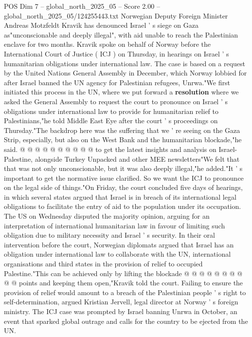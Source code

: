 \begin{textsample}{POS Dim 7 – global\_north\_2025\_05 – Score 2.00 – global\_north\_2025\_05/124255443.txt}  \label{ex:f7_pos_345}
Norwegian Deputy Foreign Minister Andreas Motzfeldt Kravik has denounced Israel ' s siege on Gaza as"unconscionable and deeply illegal", with aid unable to reach the Palestinian enclave for two months.
Kravik spoke on behalf of Norway before the International Court of Justice ( ICJ ) on Thursday, in hearings on Israel ' s humanitarian obligations under international law.
The case is based on a request by the United Nations General Assembly in December, which Norway lobbied for after Israel banned the UN agency for Palestinian refugees, Unrwa."We first initiated this process in the UN, where we put forward a \textbf{resolution} where we asked the General Assembly to request the court to pronounce on Israel ' s obligations under international law to provide for humanitarian relief to Palestinians,"he told Middle East Eye after the court ' s proceedings on Thursday."The backdrop here was the suffering that we ' re seeing on the Gaza Strip, especially, but also on the West Bank and the humanitarian blockade,"he said. @ @ @ @ @ @ @ @ @ @ to get the latest insights and analysis on Israel-Palestine, alongside Turkey Unpacked and other MEE newsletters"We felt that that was not only unconscionable, but it was also deeply illegal,"he added."It ' s important to get the normative issue clarified.
So we want the ICJ to pronounce on the legal side of things."On Friday, the court concluded five days of hearings, in which several states argued that Israel is in breach of its international legal obligations to facilitate the entry of aid to the population under its occupation.
The US on Wednesday disputed the majority opinion, arguing for an interpretation of international humanitarian law in favour of limiting such obligation due to military necessity and Israel ' s security.
In their oral intervention before the court, Norwegian diplomats argued that Israel has an obligation under international law to collaborate with the UN, international organisations and third states in the provision of relief to occupied Palestine."This can be achieved only by lifting the blockade @ @ @ @ @ @ @ @ @ @ points and keeping them open,"Kravik told the court.
Failing to ensure the provision of relief would amount to a breach of the Palestinian people ' s right to self-determination, argued Kristian Jervell, legal director at Norway ' s foreign ministry.
The ICJ case was prompted by Israel banning Unrwa in October, an event that sparked global outrage and calls for the country to be ejected from the UN.

\end{textsample}
